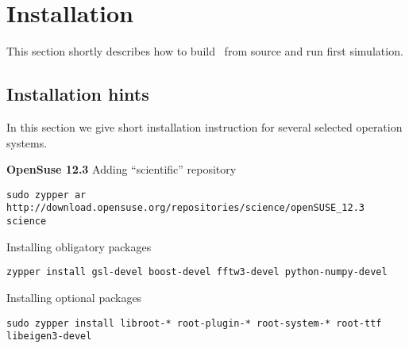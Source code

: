 \newpage
\section{Installation} 

This section shortly describes how to build \BornAgain\ from source and run first
simulation.



\subsection{Installation hints}

In this section we give short installation instruction for several selected operation systems.

\noindent
{\bf OpenSuse 12.3} \newline
Adding ``scientific'' repository 
\begin{lstlisting}[language=shell, style=commandline]
sudo zypper ar http://download.opensuse.org/repositories/science/openSUSE_12.3 science
\end{lstlisting}

\noindent
Installing obligatory packages
\begin{lstlisting}[language=shell, style=commandline]
zypper install gsl-devel boost-devel fftw3-devel python-numpy-devel
\end{lstlisting}

\noindent
Installing optional packages
\begin{lstlisting}[language=shell, style=commandline]
sudo zypper install libroot-* root-plugin-* root-system-* root-ttf libeigen3-devel
\end{lstlisting}

